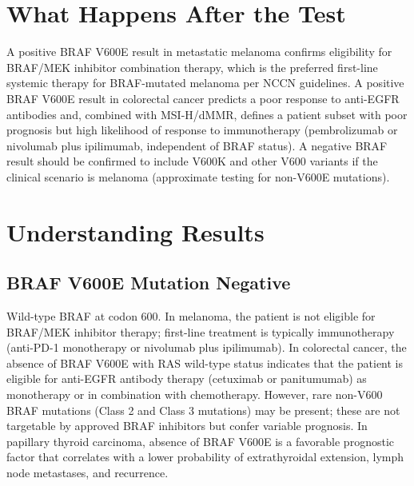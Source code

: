 \section*{What Happens After the Test}
A positive BRAF V600E result in metastatic melanoma confirms eligibility for BRAF/MEK inhibitor combination therapy, which is the preferred first-line systemic therapy for BRAF-mutated melanoma per NCCN guidelines. A positive BRAF V600E result in colorectal cancer predicts a poor response to anti-EGFR antibodies and, combined with MSI-H/dMMR, defines a patient subset with poor prognosis but high likelihood of response to immunotherapy (pembrolizumab or nivolumab plus ipilimumab, independent of BRAF status). A negative BRAF result should be confirmed to include V600K and other V600 variants if the clinical scenario is melanoma (approximate testing for non-V600E mutations).

\section*{Understanding Results}

\subsection*{BRAF V600E Mutation Negative}
Wild-type BRAF at codon 600. In melanoma, the patient is not eligible for BRAF/MEK inhibitor therapy; first-line treatment is typically immunotherapy (anti-PD-1 monotherapy or nivolumab plus ipilimumab). In colorectal cancer, the absence of BRAF V600E with RAS wild-type status indicates that the patient is eligible for anti-EGFR antibody therapy (cetuximab or panitumumab) as monotherapy or in combination with chemotherapy. However, rare non-V600 BRAF mutations (Class 2 and Class 3 mutations) may be present; these are not targetable by approved BRAF inhibitors but confer variable prognosis. In papillary thyroid carcinoma, absence of BRAF V600E is a favorable prognostic factor that correlates with a lower probability of extrathyroidal extension, lymph node metastases, and recurrence.


